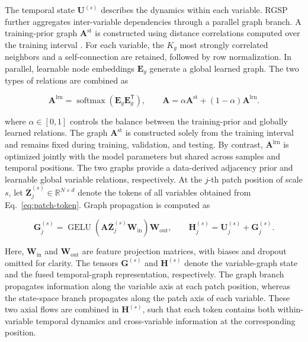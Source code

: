 The temporal state \(\mathbf{U}^{(s)}\) describes the dynamics within each variable. RGSP further aggregates inter-variable dependencies through a parallel graph branch. A training-prior graph \(\mathbf{A}^{\mathrm{st}}\) is constructed using distance correlations computed over the training interval \citep{Szekely2007DistanceCorrelation}. For each variable, the \(K_g\) most strongly correlated neighbors and a self-connection are retained, followed by row normalization. In parallel, learnable node embeddings \(\mathbf{E}_{g}\) generate a global learned graph. The two types of relations are combined as

\begin{equation}
\mathbf{A}^{\mathrm{lrn}}
=\operatorname{softmax}(\mathbf{E}_{g}\mathbf{E}_{g}^{\mathsf T}),
\qquad
\mathbf{A}=\alpha\mathbf{A}^{\mathrm{st}}
+(1-\alpha)\mathbf{A}^{\mathrm{lrn}}.
\label{eq:graph-adjacency}
\end{equation}

where \(\alpha\in[0,1]\) controls the balance between the training-prior and globally learned relations. The graph \(\mathbf A^{\mathrm{st}}\) is constructed solely from the training interval and remains fixed during training, validation, and testing. By contrast, \(\mathbf A^{\mathrm{lrn}}\) is optimized jointly with the model parameters but shared across samples and temporal positions. The two graphs provide a data-derived adjacency prior and learnable global variable relations, respectively. At the \(j\)-th patch position of scale \(s\), let \(\overline{\mathbf{Z}}^{(s)}_{j}\in\mathbb{R}^{N\times d}\) denote the tokens of all variables obtained from Eq.~\eqref{eq:patch-token}. Graph propagation is computed as

\begin{equation}
\mathbf{G}^{(s)}_{j}
=\operatorname{GELU}
\!\left(\mathbf{A}\overline{\mathbf{Z}}^{(s)}_{j}\mathbf{W}_{\mathrm{in}}\right)
\mathbf{W}_{\mathrm{out}},
\qquad
\mathbf{H}^{(s)}_{j}=\mathbf{U}^{(s)}_{j}+\mathbf{G}^{(s)}_{j}.
\label{eq:graph-propagation}
\end{equation}

Here, \(\mathbf{W}_{\mathrm{in}}\) and \(\mathbf{W}_{\mathrm{out}}\) are feature projection matrices, with biases and dropout omitted for clarity. The tensors \(\mathbf{G}^{(s)}\) and \(\mathbf{H}^{(s)}\) denote the variable-graph state and the fused temporal-graph representation, respectively. The graph branch propagates information along the variable axis at each patch position, whereas the state-space branch propagates along the patch axis of each variable. These two axial flows are combined in \(\mathbf H^{(s)}\), such that each token contains both within-variable temporal dynamics and cross-variable information at the corresponding position.

